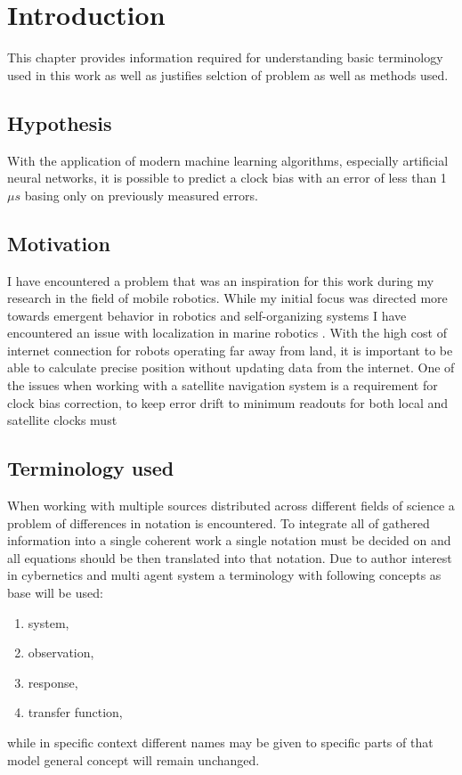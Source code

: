 \chapter{Introduction}
This chapter provides information required for understanding basic terminology used in this
work as well as justifies selction of problem as well as methods used.

\FloatBarrier
\section{Hypothesis}
With the application of modern machine learning algorithms, especially artificial neural networks,
it is possible to predict a clock bias with an error of less than 1 $\mu s$ basing only on
previously measured errors. 



\FloatBarrier
\section{Motivation}
I have encountered a problem that was an inspiration for this work during my research in the 
field of mobile robotics.
While my initial focus was directed more towards emergent behavior in robotics and self-organizing 
systems \cite{Gnys2017}\cite{Gnys2019} I have encountered an issue with localization in marine 
robotics \cite{Cabrera-Gamez2014}.
With the high cost of internet connection for robots operating far away from land, 
it is important to be able to calculate precise position without updating data from the internet.
One of the issues when working with a satellite navigation system is a requirement for clock bias
correction, to keep error drift to minimum readouts for both local and satellite clocks must

\FloatBarrier
\section{Terminology used}
When working with multiple sources distributed across different fields of science a problem of 
differences in notation is encountered. To integrate all of gathered information into a single 
coherent work a single notation must be decided on and all equations should be then translated
into that notation.
Due to author interest in cybernetics and multi agent system a terminology with following 
concepts as base will be used:
\begin{enumerate}
	\item system,
	\item observation,
	\item response,
	\item transfer function,
\end{enumerate}
while in specific context different names may be given to specific parts of that model general
concept will remain unchanged.

